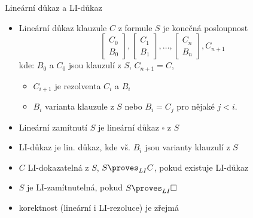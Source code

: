 \documentclass{beamer}
\begin{document}
\begin{frame}{Lineární důkaz a LI-důkaz}

    \begin{itemize}
        \item \alert{Lineární důkaz} klauzule $C$ z formule $S$ je konečná posloupnost
        $$
        \begin{bmatrix}
            C_0 \\
            B_0
        \end{bmatrix},
        \begin{bmatrix}
            C_1 \\
            B_1
        \end{bmatrix},\dots,
        \begin{bmatrix}
            C_n \\
            B_n
        \end{bmatrix},
        C_{n+1}
        $$
        kde: $B_0$ a $C_0$ jsou  klauzulí z $S$, $C_{n+1}=C$,
        \begin{itemize}
            \item $C_{i+1}$ je rezolventa $C_i$ a $B_i$
            \item $B_i$ \alert{varianta} klauzule z $S$ nebo $B_i=C_j$ pro nějaké $j<i$.
        \end{itemize}
        \item \alert{Lineární zamítnutí} $S$ je lineární důkaz $\square$ z $S$
        
        \item \alert{LI-důkaz} je lin. důkaz, kde vš. $B_i$ jsou varianty klauzulí z $S$
        \item $C$ \alert{LI-dokazatelná} z $S$, \alert{$S\proves_{LI}C$}, pokud existuje LI-důkaz
        \item $S$ je \alert{LI-zamítnutelná}, pokud $S\proves_{LI}\square$    
        \item korektnost (lineární i LI-rezoluce) je zřejmá
    \end{itemize}

    
\end{frame}
\end{document}
